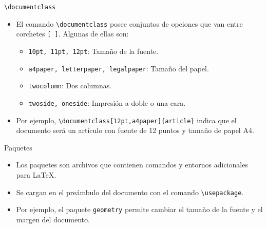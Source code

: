 \documentclass[12pt]{beamer}
\begin{document}
\begin{frame}{\texttt{\textbackslash documentclass}}
  \begin{itemize}
    \item<1-> El comando \texttt{\textbackslash documentclass} posee conjuntos de opciones que van entre corchetes \texttt{[ ]}. Algunas de ellas son:
    \begin{itemize}
      \item \texttt{10pt, 11pt, 12pt}: Tamaño de la fuente.
      \item<2-> \texttt{a4paper, letterpaper, legalpaper}: Tamaño del papel.
      \item<3-> \texttt{twocolumn}: Dos columnas.
      \item<4-> \texttt{twoside, oneside}: Impresión a doble o una cara.
    \end{itemize}
    \item<5-> Por ejemplo, \texttt{\textbackslash documentclass[12pt,a4paper]\{article\}} indica que el documento será un artículo con fuente
    de 12 puntos y tamaño de papel A4.
  \end{itemize}
\end{frame}
\begin{frame}{Paquetes}
  \begin{itemize}
    \item<1-> Los paquetes son archivos que contienen comandos y entornos adicionales para \LaTeX.
    \item<2-> Se cargan en el preámbulo del documento con el comando \texttt{\textbackslash usepackage}.
    \item<3-> Por ejemplo, el paquete \texttt{geometry} permite cambiar el tamaño de la fuente y el margen del documento.
  \end{itemize}    
\end{frame}
\end{document}
